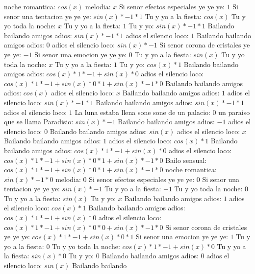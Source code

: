\documentclass{article}
\begin{document}
noche romantica: $cos(x)$  \newline melodia: $x$ Si senor efectos especiales ye ye ye: $1$  \newline Si senor una tentacion ye ye ye: $sin(x)*-1*1$ Tu y yo a la fiesta: $cos(x)$  \newline Tu y yo toda la noche: $x$ Tu y yo a la fiesta: $1$  \newline Tu y yo: $sin(x)*-1*1$ Bailando bailando amigos adios: $sin(x)*-1*1$ adios el silencio loco: $1$ Bailando bailando amigos adios: $0$  \newline adios el silencio loco: $sin(x)*-1$ Si senor corona de cristales ye ye ye: $-1$ Si senor una emocion ye ye ye: $0$  \newline Tu y yo a la fiesta: $sin(x)$  \newline Tu y yo toda la noche: $x$ Tu y yo a la fiesta: $1$  \newline Tu y yo: $cos(x)*1$ Bailando bailando amigos adios: $cos(x)*1*-1+sin(x)*0$ adios el silencio loco: ${cos(x)*1*-1+sin(x)*0}*1+sin(x)*-1*0$ Bailando bailando amigos adios: $cos(x)$  \newline adios el silencio loco: $x$ Bailando bailando amigos adios: $1$  \newline adios el silencio loco: $sin(x)*-1*1$ Bailando bailando amigos adios: $sin(x)*-1*1$ adios el silencio loco: $1$ La luna estaba llena sone sone de un palacio: $0$  \newline un paraiso que se llama Paradisio: $sin(x)*-1$ Bailando bailando amigos adios: $-1$ adios el silencio loco: $0$  \newline Bailando bailando amigos adios: $sin(x)$  \newline adios el silencio loco: $x$ Bailando bailando amigos adios: $1$  \newline adios el silencio loco: $cos(x)*1$ Bailando bailando amigos adios: $cos(x)*1*-1+sin(x)*0$ adios el silencio loco: ${cos(x)*1*-1+sin(x)*0}*1+sin(x)*-1*0$ Bailo sensual: ${cos(x)*1*-1+sin(x)*0}*1+sin(x)*-1*0$  \newline noche romantica: $sin(x)*-1*0$ melodia: $0$ Si senor efectos especiales ye ye ye: $0$  \newline Si senor una tentacion ye ye ye: $sin(x)*-1$ Tu y yo a la fiesta: $-1$ Tu y yo toda la noche: $0$  \newline Tu y yo a la fiesta: $sin(x)$  \newline Tu y yo: $x$ Bailando bailando amigos adios: $1$  \newline adios el silencio loco: $cos(x)*1$ Bailando bailando amigos adios: $cos(x)*1*-1+sin(x)*0$ adios el silencio loco: ${cos(x)*1*-1+sin(x)*0}*0+sin(x)*-1*0$ Si senor corona de cristales ye ye ye: ${cos(x)*1*-1+sin(x)*0}*1$ Si senor una emocion ye ye ye: $1$ Tu y yo a la fiesta: $0$  \newline Tu y yo toda la noche: $cos(x)*1*-1+sin(x)*0$  \newline Tu y yo a la fiesta: $sin(x)*0$ Tu y yo: $0$ Bailando bailando amigos adios: $0$  \newline adios el silencio loco: $sin(x)$  \newline Bailando bailando 
\end{document}
